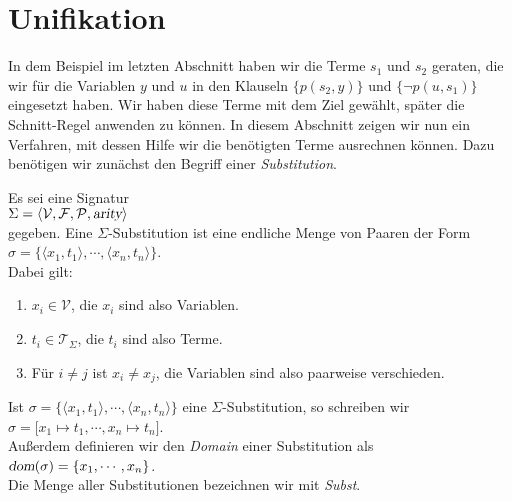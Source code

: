 \section{Unifikation}
In dem  Beispiel im letzten Abschnitt haben wir die Terme $s_1$ und $s_2$ geraten, die wir f\"{u}r die Variablen
$y$ und $u$ in den Klauseln $\big\{ p(s_2,y) \big\}$ und  $\big\{\neg p(u,s_1)\big\}$
eingesetzt haben.  Wir haben diese Terme mit dem Ziel gew\"{a}hlt, sp\"{a}ter die Schnitt-Regel
anwenden zu k\"{o}nnen.  In diesem Abschnitt zeigen wir nun ein Verfahren, mit dessen Hilfe
wir die ben\"{o}tigten Terme ausrechnen k\"{o}nnen.
Dazu ben\"{o}tigen wir zun\"{a}chst den Begriff einer {\emph{\color{blue}Substitution}}.
\begin{Definition}[Substitution]
    Es sei eine Signatur \\[0.2cm]
    \hspace*{1.3cm} $\Sigma = \langle \mathcal{V}, \mathcal{F}, \mathcal{P}, \textsl{arity} \rangle$ \\[0.2cm]
    gegeben.  Eine {\color{blue}$\Sigma$-Substitution} ist eine endliche Menge von Paaren der Form \\[0.2cm]
    \hspace*{1.3cm} $\sigma = \bigl\{ \langle x_1, t_1 \rangle, \cdots, \langle x_n, t_n \rangle \bigr\}$. \\[0.2cm]
    Dabei gilt:
    \begin{enumerate}
    \item $x_i \in \mathcal{V}$, die $x_i$ sind also Variablen.
    \item $t_i \in \mathcal{T}_\Sigma$, die $t_i$ sind also Terme.
    \item F\"{u}r $i\not=j$ ist $x_i \not= x_j$, die Variablen sind also paarweise verschieden.
    \end{enumerate}
    
    Ist $\sigma = \bigl\{ \langle x_1, t_1 \rangle, \cdots, \langle x_n, t_n \rangle \bigr\}$ eine
    $\Sigma$-Substitution, so schreiben wir  \\[0.2cm]
    \hspace*{1.3cm} $\sigma = \bigl[ x_1 \mapsto t_1, \cdots, x_n \mapsto t_n \bigr]$.  \\[0.2cm]
    Au\ss{}erdem definieren wir den \emph{Domain} einer Substitution als \\[0.2cm]
    \hspace*{1.3cm} $\textsl{dom}(\sigma) = \{ x_1, \cdots, x_n\}$.
    \\[0.2cm]
    Die Menge aller Substitutionen bezeichnen wir mit \textsl{Subst}.
    \eox
\end{Definition}

